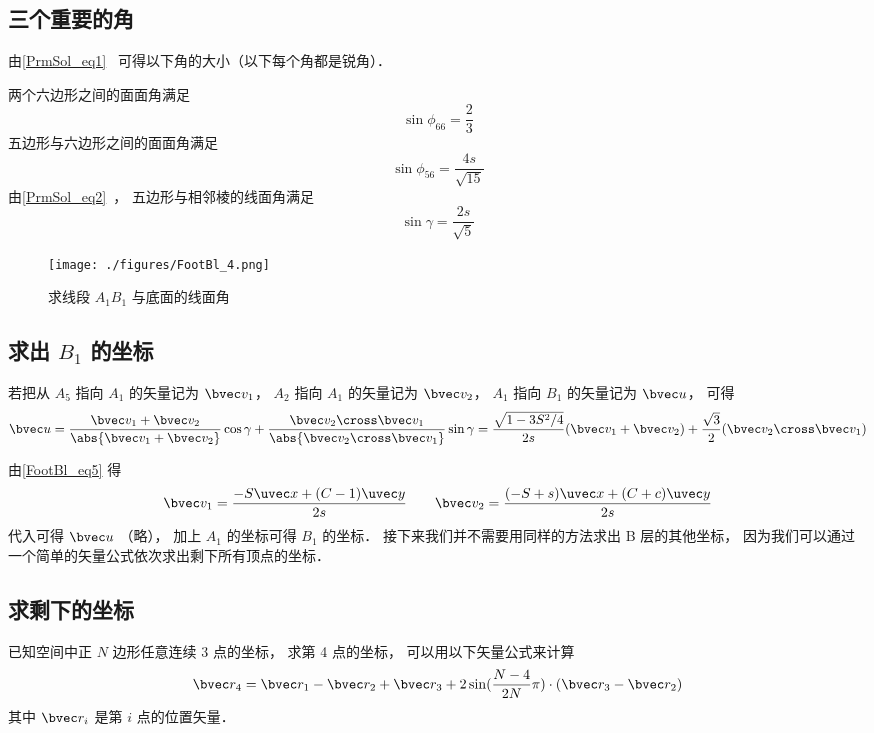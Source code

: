 \subsection{三个重要的角}
由\autoref{PrmSol_eq1}~ 可得以下角的大小（以下每个角都是锐角）．

两个六边形之间的面面角满足
\begin{equation}
\sin\phi_{66} = \frac{2}{3}
\end{equation}
五边形与六边形之间的面面角满足
\begin{equation}
\sin\phi_{56} = \frac{4s}{\sqrt{15}}
\end{equation}
由\autoref{PrmSol_eq2}~， 五边形与相邻棱的线面角满足 %
\begin{equation}
\sin\gamma = \frac{2s}{\sqrt5}
\end{equation}

\begin{figure}[ht]
\centering
\texttt{[image: ./figures/FootBl\_4.png]}
\caption{求线段 $A_1 B_1$ 与底面的线面角} \label{FootBl_fig4}
\end{figure}

\subsection{求出 $B_1$ 的坐标}

若把从 $A_5$ 指向 $A_1$ 的矢量记为 $\bvec v_1$， $A_2$ 指向 $A_1$ 的矢量记为 $\bvec v_2$， $A_1$ 指向 $B_1$ 的矢量记为 $\bvec u$， 可得
\begin{equation}
\bvec u = \frac{\bvec v_1 + \bvec v_2}{\abs{\bvec v_1 + \bvec v_2}} \cos\gamma
+ \frac{\bvec v_2 \cross \bvec v_1}{\abs{\bvec v_2 \cross \bvec v_1}} \sin\gamma
= \frac{\sqrt{1 - 3S^2/4}}{2s} (\bvec v_1 + \bvec v_2) + \frac{\sqrt{3}}{2} (\bvec v_2 \cross \bvec v_1)
\end{equation}

由\autoref{FootBl_eq5} 得
\begin{equation}
\bvec v_1 = \frac{-S \uvec x + (C-1)\uvec y}{2s} \qquad
\bvec v_2 = \frac{(-S+s)\uvec x + (C+c)\uvec y}{2s}
\end{equation}
代入可得 $\bvec u$ （略）， 加上 $A_1$ 的坐标可得 $B_1$ 的坐标． 接下来我们并不需要用同样的方法求出 B 层的其他坐标， 因为我们可以通过一个简单的矢量公式依次求出剩下所有顶点的坐标．

\subsection{求剩下的坐标}
已知空间中正 $N$ 边形任意连续 3 点的坐标， 求第 4 点的坐标， 可以用以下矢量公式来计算
\begin{equation}\label{FootBl_eq9}
\bvec r_4 = \bvec r_1 - \bvec r_2 + \bvec r_3 + 2\sin(\frac{N-4}{2N}\pi) \cdot (\bvec r_3  - \bvec r_2)
\end{equation}
其中 $\bvec r_i$ 是第 $i$ 点的位置矢量．

